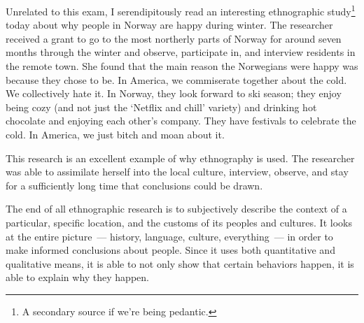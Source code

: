 \documentclass[12pt]{article}
\begin{document}
Unrelated to this exam, I serendipitously read an interesting ethnographic study\footnote{A secondary source if we're being pedantic.} today about why people in Norway are happy during winter. The researcher received a grant to go to the most northerly parts of Norway for around seven months through the winter and observe, participate in, and interview residents in the remote town. She found that the main reason the Norwegians were happy was because they chose to be. In America, we commiserate together about the cold. We collectively hate it. In Norway, they look forward to ski season; they enjoy being cozy (and not just the `Netflix and chill' variety) and drinking hot chocolate and enjoying each other's company. They have festivals to celebrate the cold. In America, we just bitch and moan about it.

This research is an excellent example of why ethnography is used. The researcher was able to assimilate herself into the local culture, interview, observe, and stay for a sufficiently long time that conclusions could be drawn.

The end of all ethnographic research is to subjectively describe the context of a particular, specific location, and the customs of its peoples and cultures. It looks at the entire picture~--- history, language, culture, everything~--- in order to make informed conclusions about people. Since it uses both quantitative and qualitative means, it is able to not only show that certain behaviors happen, it is able to explain why they happen.
\end{document}
